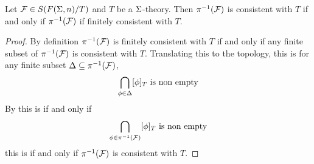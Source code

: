 \begin{prop}
    Let $\mathcal{F} \in S(F(\Sigma,n)/T)$ and $T$ be a $\Sigma$-theory.
    Then $\pi^{-1}(\mathcal{F})$ is consistent with $T$ 
    if and only if $\pi^{-1}(\mathcal{F})$ if finitely consistent
    with $T$.
\end{prop}
\begin{proof}
    By definition $\pi^{-1}(\mathcal{F})$ is finitely consistent with $T$ if and only if 
    any finite subset of $\pi^{-1}(\mathcal{F})$ is consistent with $T$.
    Translating this to the topology, this is
    for any finite subset $\Delta \subseteq \pi^{-1}(\mathcal{F})$,
    \[\bigcap_{\phi \in \Delta} [\phi]_T \text{ is non empty}\]
    By  
    this is if and only if 
    \[\bigcap_{\phi \in \pi^{-1}(\mathcal{F})} [\phi]_T \text{ is non empty}\]
    this is if and only if $\pi^{-1}(\mathcal{F})$ is consistent with $T$.
\end{proof}